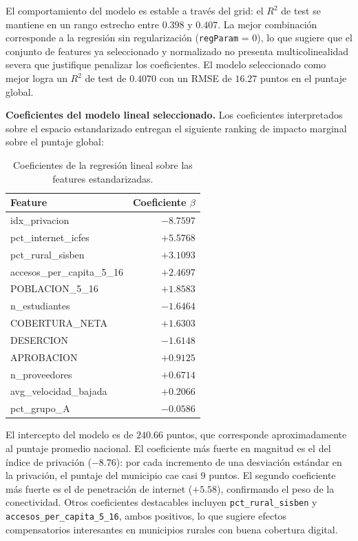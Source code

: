 El comportamiento del modelo es estable a través del grid: el $R^2$ de test se mantiene en un rango estrecho entre $0.398$ y $0.407$. La mejor combinación corresponde a la regresión sin regularización (\texttt{regParam} = $0$), lo que sugiere que el conjunto de features ya seleccionado y normalizado no presenta multicolinealidad severa que justifique penalizar los coeficientes. El modelo seleccionado como mejor logra un $R^2$ de test de $0.4070$ con un RMSE de $16.27$ puntos en el puntaje global.

\textbf{Coeficientes del modelo lineal seleccionado.} Los coeficientes interpretados sobre el espacio estandarizado entregan el siguiente ranking de impacto marginal sobre el puntaje global:

\begin{table}[H]
\centering
\caption{Coeficientes de la regresión lineal sobre las features estandarizadas.}
\begin{tabular}{l r}
\toprule
\textbf{Feature} & \textbf{Coeficiente $\beta$} \\
\midrule
idx\_privacion              & $-8.7597$ \\
pct\_internet\_icfes         & $+5.5768$ \\
pct\_rural\_sisben           & $+3.1093$ \\
accesos\_per\_capita\_5\_16  & $+2.4697$ \\
POBLACION\_5\_16             & $+1.8583$ \\
n\_estudiantes               & $-1.6464$ \\
COBERTURA\_NETA              & $+1.6303$ \\
DESERCION                    & $-1.6148$ \\
APROBACION                   & $+0.9125$ \\
n\_proveedores               & $+0.6714$ \\
avg\_velocidad\_bajada       & $+0.2066$ \\
pct\_grupo\_A                & $-0.0586$ \\
\bottomrule
\end{tabular}
\end{table}

El intercepto del modelo es de $240.66$ puntos, que corresponde aproximadamente al puntaje promedio nacional. El coeficiente más fuerte en magnitud es el del índice de privación ($-8.76$): por cada incremento de una desviación estándar en la privación, el puntaje del municipio cae casi 9 puntos. El segundo coeficiente más fuerte es el de penetración de internet ($+5.58$), confirmando el peso de la conectividad. Otros coeficientes destacables incluyen \texttt{pct\_rural\_sisben} y \texttt{accesos\_per\_capita\_5\_16}, ambos positivos, lo que sugiere efectos compensatorios interesantes en municipios rurales con buena cobertura digital.

